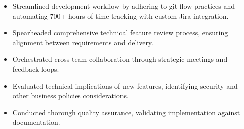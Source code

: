 \documentclass[a4paper,10pt]{article}
\newenvironment{achievementList}{
    \begin{itemize}[
        leftmargin=1em,
        itemindent=0mm,
        itemsep=2.5pt,
        topsep=0.2em,
        parsep=0mm,
    ]
    \sloppy
    \hyphenpenalty=1000
    \exhyphenpenalty=1000
    \setlength{\rightskip}{0mm plus 20em}
    \spaceskip=0.22em
}{
    \end{itemize}
}
\begin{document}
\begin{achievementList}
    \item Streamlined development workflow by adhering to git-flow practices and automating 700+ hours of time tracking with custom Jira integration.


    \item Spearheaded comprehensive technical feature review process, ensuring alignment between requirements and delivery.
    \item Orchestrated cross-team collaboration through strategic meetings and feedback loops.
    \item Evaluated technical implications of new features, identifying security and other business policies considerations.
    \item Conducted thorough quality assurance, validating implementation against documentation.


\end{achievementList}
\end{document}
